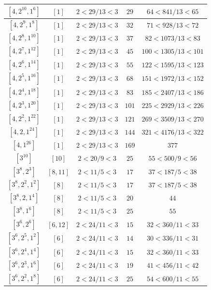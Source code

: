 \documentclass{article}%
\begin{document}
\begin{center}
\begin{longtable}{||c|c|c|c|c||}
$[4, 2^{10}, 1^{6}]$ & $[1]$ & $2 < 29/13 < 3$ & $29$ & $64 < 841/13 < 65$ \\ \hline 
$[4, 2^{9}, 1^{8}]$ & $[1]$ & $2 < 29/13 < 3$ & $32$ & $71 < 928/13 < 72$ \\ \hline 
$[4, 2^{8}, 1^{10}]$ & $[1]$ & $2 < 29/13 < 3$ & $37$ & $82 < 1073/13 < 83$ \\ \hline 
$[4, 2^{7}, 1^{12}]$ & $[1]$ & $2 < 29/13 < 3$ & $45$ & $100 < 1305/13 < 101$ \\ \hline 
$[4, 2^{6}, 1^{14}]$ & $[1]$ & $2 < 29/13 < 3$ & $55$ & $122 < 1595/13 < 123$ \\ \hline 
$[4, 2^{5}, 1^{16}]$ & $[1]$ & $2 < 29/13 < 3$ & $68$ & $151 < 1972/13 < 152$ \\ \hline 
$[4, 2^{4}, 1^{18}]$ & $[1]$ & $2 < 29/13 < 3$ & $83$ & $185 < 2407/13 < 186$ \\ \hline 
$[4, 2^{3}, 1^{20}]$ & $[1]$ & $2 < 29/13 < 3$ & $101$ & $225 < 2929/13 < 226$ \\ \hline 
$[4, 2^{2}, 1^{22}]$ & $[1]$ & $2 < 29/13 < 3$ & $121$ & $269 < 3509/13 < 270$ \\ \hline 
$[4, 2, 1^{24}]$ & $[1]$ & $2 < 29/13 < 3$ & $144$ & $321 < 4176/13 < 322$ \\ \hline 
$[4, 1^{26}]$ & $[1]$ & $2 < 29/13 < 3$ & $169$ & $377$ \\ \hline 
$[3^{10}]$ & $[10]$ & $2 < 20/9 < 3$ & $25$ & $55 < 500/9 < 56$ \\ \hline 
$[3^{8}, 2^{3}]$ & $[8, 11]$ & $2 < 11/5 < 3$ & $17$ & $37 < 187/5 < 38$ \\ \hline 
$[3^{8}, 2^{2}, 1^{2}]$ & $[8]$ & $2 < 11/5 < 3$ & $17$ & $37 < 187/5 < 38$ \\ \hline 
$[3^{8}, 2, 1^{4}]$ & $[8]$ & $2 < 11/5 < 3$ & $20$ & $44$ \\ \hline 
$[3^{8}, 1^{6}]$ & $[8]$ & $2 < 11/5 < 3$ & $25$ & $55$ \\ \hline 
$[3^{6}, 2^{6}]$ & $[6, 12]$ & $2 < 24/11 < 3$ & $15$ & $32 < 360/11 < 33$ \\ \hline 
$[3^{6}, 2^{5}, 1^{2}]$ & $[6]$ & $2 < 24/11 < 3$ & $14$ & $30 < 336/11 < 31$ \\ \hline 
$[3^{6}, 2^{4}, 1^{4}]$ & $[6]$ & $2 < 24/11 < 3$ & $15$ & $32 < 360/11 < 33$ \\ \hline 
$[3^{6}, 2^{3}, 1^{6}]$ & $[6]$ & $2 < 24/11 < 3$ & $19$ & $41 < 456/11 < 42$ \\ \hline 
$[3^{6}, 2^{2}, 1^{8}]$ & $[6]$ & $2 < 24/11 < 3$ & $25$ & $54 < 600/11 < 55$ \\ \hline 

\end{longtable}
\end{center}
\end{document}
